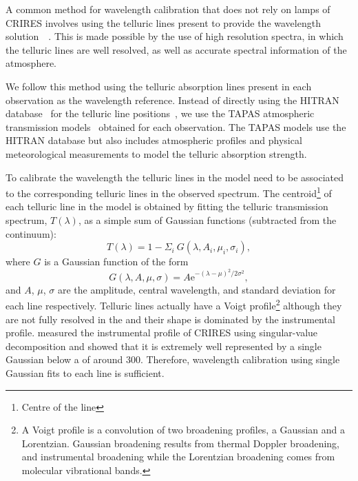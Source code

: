 A common method for wavelength calibration that does not rely on \thar{} lamps of {CRIRES} involves using the telluric lines present to provide the wavelength solution~\citep[e.g.][]{brogi_signature_2012,brogi_carbon_2014,dekok_detection_2013}{\red{}~\citep{piskorz_evidence_2016}}.
This is made possible by the use of high resolution spectra, in which the telluric lines are well resolved, as well as accurate spectral information of the atmosphere.

We follow this method using the telluric absorption lines present in each observation as the wavelength reference. Instead of directly using the {HITRAN} database~\citep{rothman_hitran2012_2013} for the telluric line positions~\citet[such as in][]{brogi_signature_2012,brogi_carbon_2014,dekok_detection_2013}, we use the {TAPAS} atmospheric transmission models~\citep{bertaux_tapas_2014} obtained for each observation. The {TAPAS} models use the {HITRAN} database but also includes atmospheric profiles and physical meteorological measurements to model the telluric absorption strength.

To calibrate the wavelength the telluric lines in the model need to be associated to the corresponding telluric lines in the observed spectrum. The centroid\footnote{Centre of the line} of each telluric line in the model is obtained by fitting the telluric transmission spectrum, \(T(\lambda)\), as a simple sum of Gaussian functions (subtracted from the continuum):
\begin{equation}
T(\lambda) = 1 - {\Sigma}_{i}\ G(\lambda, A_{i}, {\mu}_{i}, {\sigma}_{i}),
\end{equation}
where \(G\) is a Gaussian function of the form
\begin{equation}
G(\lambda, A, \mu, \sigma) = {A \textrm{e}}^{{-(\lambda-\mu)}^{2}/2\sigma^{2}},
\end{equation}
and \(A\), \(\mu\), \(\sigma\) are the amplitude, central wavelength, and standard deviation for each line respectively. Telluric lines actually have a Voigt profile\footnote{A Voigt profile is a convolution of two broadening profiles, a Gaussian and a Lorentzian. Gaussian broadening results from thermal Doppler broadening, and instrumental broadening while the Lorentzian broadening comes from molecular vibrational bands\citep{meier_art_2005}.} although they are not fully resolved in the \nir{} and their shape is dominated by the instrumental profile. \citet{seifahrt_synthesising_2010} measured the instrumental profile of {CRIRES} using singular-value decomposition and showed that it is extremely well represented by a single Gaussian below a \snr{} of around 300. Therefore, wavelength calibration using single Gaussian fits to each line is sufficient.

